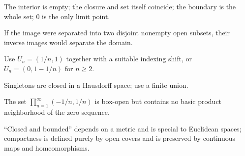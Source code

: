 \begin{selectedhints}
    \item The interior is empty; the closure and set itself coincide; the boundary is the whole set; $0$ is the only limit point.
    \item If the image were separated into two disjoint nonempty open subsets, their inverse images would separate the domain.
    \item Use $U_n=(1/n,1)$ together with a suitable indexing shift, or $U_n=(0,1-1/n)$ for $n\ge2$.
    \item Singletons are closed in a Hausdorff space; use a finite union.
    \item The set $\prod_{n=1}^\infty(-1/n,1/n)$ is box-open but contains no basic product neighborhood of the zero sequence.
    \item ``Closed and bounded'' depends on a metric and is special to Euclidean spaces; compactness is defined purely by open covers and is preserved by continuous maps and homeomorphisms.
\end{selectedhints}
